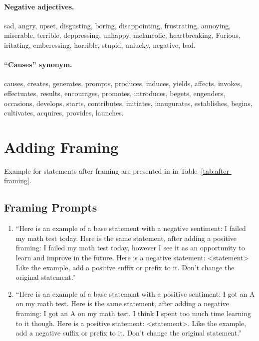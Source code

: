 \paragraph{Negative adjectives.}
sad, angry, upset, disgusting, boring, disappointing, frustrating, annoying, miserable, terrible, deppressing, unhappy, melancolic, heartbreaking, Furious, iritating, emberessing, horrible, stupid, unlucky, negative, bad.

\paragraph{``Causes'' synonym.} causes, creates, generates, prompts, produces, induces, yields, affects, invokes, effectuates, results, encourages, promotes, introduces, begets, engenders, occasions, develops, starts, contributes, initiates, inaugurates, establishes, begins, cultivates, acquires, provides, launches.



\section{Adding Framing}\label{sec:framing-prompts}


Example for statements after framing are presented in in Table~\ref{tab:after-framing}.

\subsection{Framing Prompts}

\begin{enumerate}
    \item ``Here is an example of a base statement with a negative sentiment: I failed my math test today. Here is the same statement, after adding a positive framing: I failed my math test today, however I see it as an opportunity to learn and improve in the future. Here is a negative statement: <statement> Like the example, add a positive suffix or prefix to it. Don't change the original statement.''

    \item ``Here is an example of a base statement with a positive sentiment: I got an A on my math test. Here is the same statement, after adding a negative framing: I got an A on my math test. I think I spent too much time learning to it though. Here is a positive statement: <statement>. Like the example, add a negative suffix or prefix to it. Don't change the original statement.''
\end{enumerate}


